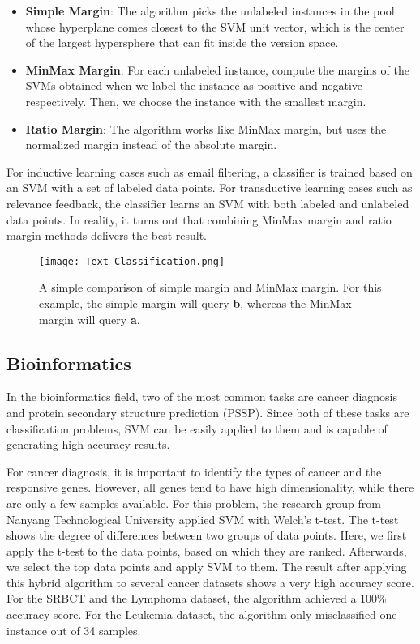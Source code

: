 \begin{itemize}
    \item \textbf{Simple Margin}: The algorithm picks the unlabeled instances
    in the pool whose hyperplane comes closest to the SVM unit vector, which is
    the center of the largest hypersphere that can fit inside the version space.
    \item \textbf{MinMax Margin}: For each unlabeled instance, compute the margins
    of the SVMs obtained when we label the instance as positive and negative
    respectively. Then, we choose the instance with the smallest margin.
    \item \textbf{Ratio Margin}: The algorithm works like MinMax margin, but uses
    the normalized margin instead of the absolute margin.
\end{itemize}

For inductive learning cases such as email filtering, a classifier is trained 
based on an SVM with a set of labeled data points.
For transductive learning cases such as relevance feedback, the classifier
learns an SVM with both labeled and unlabeled data points. In reality, it turns
out that combining MinMax margin and ratio margin methods delivers the best
result. \cite{text-classification}
\begin{figure}[h]%
    \begin{center}%
        \texttt{[image: Text\_Classification.png]}%
        \caption{
        A simple comparison of simple margin and MinMax margin.
        For this example, the simple margin will query \textbf{b},
        whereas the MinMax margin will query \textbf{a}.
        \cite{text-classification}}\label{fig:}%
    \end{center}%
\end{figure}


\subsection*{Bioinformatics}
In the bioinformatics field, two of the most common tasks are cancer
diagnosis and protein secondary structure prediction (PSSP). Since both of these
tasks are classification problems, SVM can be easily applied to them and is
capable of generating high accuracy results.

For cancer diagnosis, it is important to identify the types of cancer and the
responsive genes. However, all genes tend to have high dimensionality, while 
there are only a few samples available. For this problem, the research group
from Nanyang Technological University applied SVM with Welch's t-test.
The t-test shows the degree of differences between two groups of data points.
Here, we first apply the t-test to the data points, based on which they are 
ranked. Afterwards, we select the top data points and apply SVM to them.
The result after applying this hybrid algorithm to several cancer datasets 
shows a very high accuracy score. For the SRBCT and the Lymphoma dataset, the
algorithm achieved a 100\% accuracy score. For the Leukemia dataset, the
algorithm only misclassified one instance out of 34 samples.

